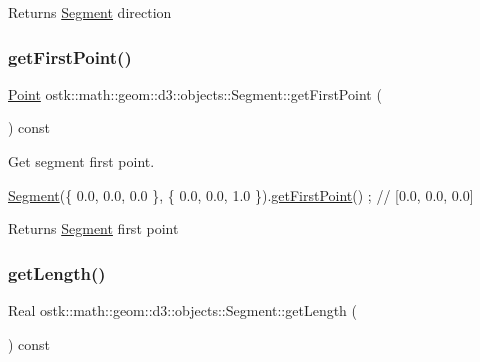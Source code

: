 \begin{DoxyReturn}{Returns}
\hyperlink{classostk_1_1math_1_1geom_1_1d3_1_1objects_1_1_segment}{Segment} direction 
\end{DoxyReturn}
\mbox{\label{classostk_1_1math_1_1geom_1_1d3_1_1objects_1_1_segment_a0dd0944d8a53bc07b241fc933a2b023f}} 
\subsubsection{\texorpdfstring{get\+First\+Point()}{getFirstPoint()}}
{\footnotesize\ttfamily \hyperlink{classostk_1_1math_1_1geom_1_1d3_1_1objects_1_1_point}{Point} ostk\+::math\+::geom\+::d3\+::objects\+::\+Segment\+::get\+First\+Point (\begin{DoxyParamCaption}{ }\end{DoxyParamCaption}) const}



Get segment first point. 


\begin{DoxyCode}
\hyperlink{classostk_1_1math_1_1geom_1_1d3_1_1objects_1_1_segment_aa2cb60ce06335a5f76120c658219494c}{Segment}(\{ 0.0, 0.0, 0.0 \}, \{ 0.0, 0.0, 1.0 \}).\hyperlink{classostk_1_1math_1_1geom_1_1d3_1_1objects_1_1_segment_a0dd0944d8a53bc07b241fc933a2b023f}{getFirstPoint}() ; \textcolor{comment}{// [0.0, 0.0, 0.0]}
\end{DoxyCode}


\begin{DoxyReturn}{Returns}
\hyperlink{classostk_1_1math_1_1geom_1_1d3_1_1objects_1_1_segment}{Segment} first point 
\end{DoxyReturn}
\mbox{\label{classostk_1_1math_1_1geom_1_1d3_1_1objects_1_1_segment_a0f40747b4f8da2ef00b57ff0e4445968}} 
\subsubsection{\texorpdfstring{get\+Length()}{getLength()}}
{\footnotesize\ttfamily Real ostk\+::math\+::geom\+::d3\+::objects\+::\+Segment\+::get\+Length (\begin{DoxyParamCaption}{ }\end{DoxyParamCaption}) const}



